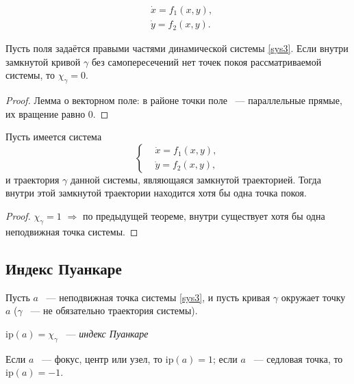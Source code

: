 \begin{equation} \label{sys3}
\begin{split}
    & \dot{x} = f_1(x, y), {} \\
    & \dot{y} = f_2(x, y).
\end{split}
\end{equation}

\begin{theorem}
Пусть поля задаётся правыми частями динамической системы \ref{sys3}. Если внутри замкнутой кривой $\gamma$ без самопересечений нет точек покоя рассматриваемой системы, то \( \chi_\gamma = 0 \).
\end{theorem}

\begin{proof}
Лемма о векторном поле: в районе точки поле ~--- параллельные прямые, их вращение равно 0.
\end{proof}

\begin{theorem}
Пусть имеется система
\[ \left\lbrace \begin{aligned}
    & \dot{x} = f_1(x, y), \\
    & \dot{y} = f_2(x, y),
\end{aligned} \right. \]
и траектория \( \gamma \) данной системы, являющаяся замкнутой траекторией. Тогда внутри этой замкнутой траектории находится хотя бы одна точка покоя.
\end{theorem}

\begin{proof}
\( \chi_\gamma = 1 \) \( \Rightarrow \) по предыдущей теореме, внутри существует хотя бы одна неподвижная точка системы.
\end{proof}

\subsection{Индекс Пуанкаре}

Пусть $a$ ~--- неподвижная точка системы \ref{sys3}, и пусть кривая \( \gamma \) окружает точку \( a \) ($\gamma$ ~--- не обязательно траектория системы).

\begin{definition}
\( \mathrm{ip}(a) = \chi_\gamma \) ~--- \textit{индекс Пуанкаре}
\end{definition}

\begin{proposition}
Если $a$ ~--- фокус, центр или узел, то $\mathrm{ip}(a) = 1$; если $a$ ~--- седловая точка, то $\mathrm{ip}(a) = -1$.
\end{proposition}

